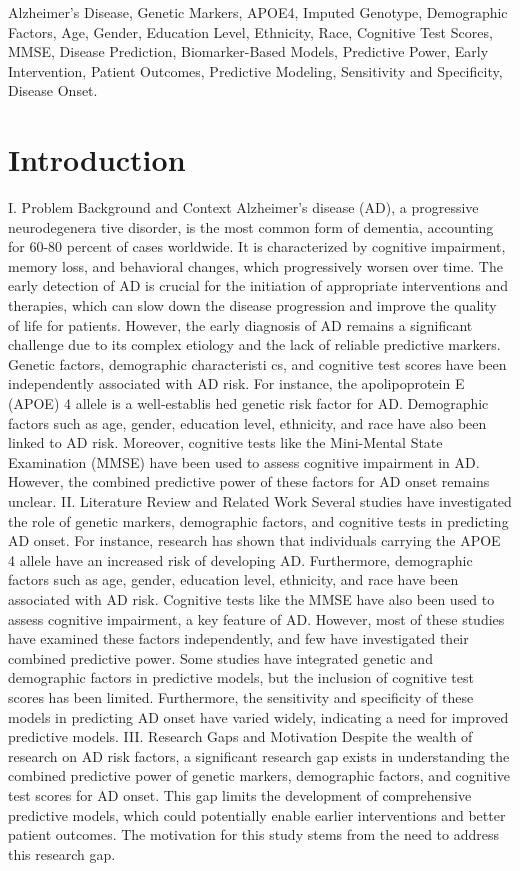 \documentclass[conference]{IEEEtran}
\begin{document}
\begin{IEEEkeywords}
Alzheimer's Disease, Genetic Markers, APOE4, Imputed Genotype, Demographic Factors, Age, Gender, Education Level, Ethnicity, Race, Cognitive Test Scores, MMSE, Disease Prediction, Biomarker-Based Models, Predictive Power, Early Intervention, Patient Outcomes, Predictive Modeling, Sensitivity and Specificity, Disease Onset.
\end{IEEEkeywords}

\section{Introduction}
I. Problem Background and Context Alzheimer's disease (AD), a progressive neurodegenera tive disorder, is the most common form of dementia, accounting for 60-80 percent of cases worldwide. It is characterized by cognitive impairment, memory loss, and behavioral changes, which progressively worsen over time. The early detection of AD is crucial for the initiation of appropriate interventions and therapies, which can slow down the disease progression and improve the quality of life for patients. However, the early diagnosis of AD remains a significant challenge due to its complex etiology and the lack of reliable predictive markers. Genetic factors, demographic characteristi cs, and cognitive test scores have been independently associated with AD risk. For instance, the apolipoprotein E (APOE) 4 allele is a well-establis hed genetic risk factor for AD. Demographic factors such as age, gender, education level, ethnicity, and race have also been linked to AD risk. Moreover, cognitive tests like the Mini-Mental State Examination (MMSE) have been used to assess cognitive impairment in AD. However, the combined predictive power of these factors for AD onset remains unclear. II. Literature Review and Related Work Several studies have investigated the role of genetic markers, demographic factors, and cognitive tests in predicting AD onset. For instance, research has shown that individuals carrying the APOE 4 allele have an increased risk of developing AD. Furthermore, demographic factors such as age, gender, education level, ethnicity, and race have been associated with AD risk. Cognitive tests like the MMSE have also been used to assess cognitive impairment, a key feature of AD. However, most of these studies have examined these factors independently, and few have investigated their combined predictive power. Some studies have integrated genetic and demographic factors in predictive models, but the inclusion of cognitive test scores has been limited. Furthermore, the sensitivity and specificity of these models in predicting AD onset have varied widely, indicating a need for improved predictive models. III. Research Gaps and Motivation Despite the wealth of research on AD risk factors, a significant research gap exists in understanding the combined predictive power of genetic markers, demographic factors, and cognitive test scores for AD onset. This gap limits the development of comprehensive predictive models, which could potentially enable earlier interventions and better patient outcomes. The motivation for this study stems from the need to address this research gap. 
\end{document}
